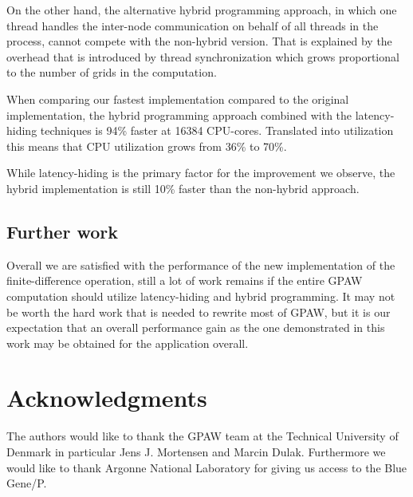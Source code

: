 \documentclass[preprint,3p,times,twocolumn]{elsarticle}
\begin{document}
On the other hand, the alternative hybrid programming approach, in which one thread handles the inter-node communication on behalf of all threads in the process, cannot compete with the non-hybrid version. That is explained by the overhead that is introduced by thread synchronization which grows proportional to the number of grids in the computation.

When comparing our fastest implementation compared to the original implementation, the hybrid programming approach combined with the latency-hiding techniques is 94\% faster at 16384 CPU-cores. Translated into utilization this means that CPU utilization grows from 36\% to 70\%.

While latency-hiding is the primary factor for the improvement we observe, the hybrid implementation is still 10\% faster than the non-hybrid approach.

\subsection{Further work}
Overall we are satisfied with the performance of the new implementation of the finite-difference operation, still a lot of work remains if the entire GPAW computation should utilize latency-hiding and hybrid programming. It may not be worth the hard work that is needed to rewrite most of GPAW, but it is our expectation that an overall performance gain as the one demonstrated in this work may be obtained for the application overall.

\section{Acknowledgments}
The authors would like to thank the GPAW team at the Technical University of Denmark in particular Jens J. Mortensen and Marcin Dulak. Furthermore we would like to thank Argonne National Laboratory for giving us access to the Blue Gene/P.




\end{document}
